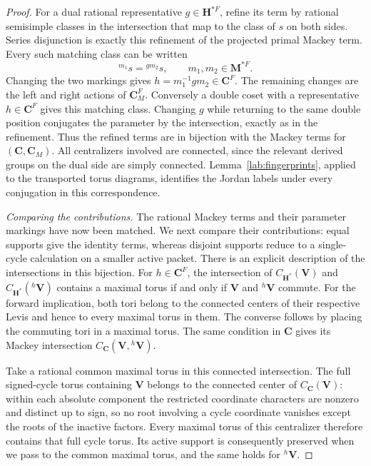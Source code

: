\begin{proof}
For a dual rational representative $g\in\mathbf H^{*F}$,
refine its term by rational semisimple classes in the intersection
that map to the class of $s$ on both sides.
Series disjunction is exactly this refinement of the projected
primal Mackey term.  Every such matching class can be written
\[
 {}^{m_1}s={} ^{g m_2}s,
       \qquad m_1,m_2\in\mathbf M^{*F}.
\]
Changing the two markings gives
$h=m_1^{-1}g m_2\in\mathbf C^F$.
The remaining changes are the left and right actions of
$\mathbf C_M^F$.  Conversely a double coset with a
representative $h\in\mathbf C^F$ gives this matching class.
Changing $g$ while returning to the same double position
conjugates the parameter by the intersection, exactly as in
the refinement.  Thus the refined terms are in bijection with
the Mackey terms for $(\mathbf C,\mathbf C_M)$.
All centralizers involved are connected, since the relevant
derived groups on the dual side are simply connected.
Lemma~\ref{lab:fingerprints}, applied to the transported torus
diagrams, identifies the Jordan labels under every conjugation
in this correspondence.

\smallskip\noindent\emph{Comparing the contributions.}
The rational Mackey terms and their parameter markings have now
been matched.  We next compare their contributions: equal supports
give the identity terms, whereas disjoint supports reduce to a
single-cycle calculation on a smaller active packet.
There is an explicit description of the intersections in this
bijection.  For $h\in\mathbf C^F$, the intersection of
$C_{\mathbf H^*}(\mathbf V)$ and
$C_{\mathbf H^*}({}^h\mathbf V)$ contains a maximal torus
if and only if $\mathbf V$ and ${}^h\mathbf V$ commute.
For the forward implication, both tori belong to the connected
centers of their respective Levis and hence to every maximal
torus in them.  The converse follows by placing the commuting
tori in a maximal torus.  The same condition in $\mathbf C$
gives its Mackey intersection
$C_{\mathbf C}(\mathbf V,{}^h\mathbf V)$.

Take a rational common maximal torus in this connected
intersection.  The full signed-cycle torus containing
$\mathbf V$ belongs to the connected center of
$C_{\mathbf C}(\mathbf V)$: within each absolute component
the restricted coordinate characters are nonzero and distinct
up to sign, so no root involving a cycle coordinate vanishes
except the roots of the inactive factors.  Every maximal
torus of this centralizer therefore contains that full cycle
torus.  Its active support is consequently preserved when
we pass to the common maximal torus, and the same holds for
${}^h\mathbf V$.


\end{proof}
